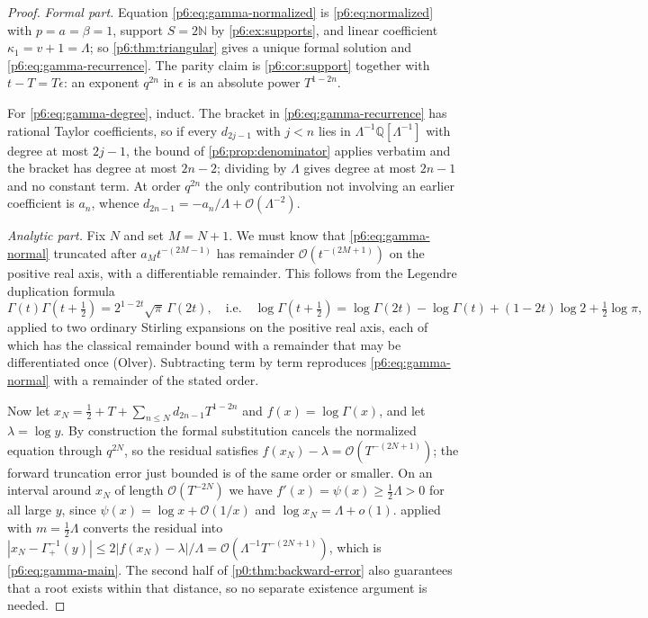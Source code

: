\documentclass[11pt,a4paper,oneside]{book}
\theoremstyle{plain}
\theoremstyle{definition}
\theoremstyle{remark}
\newcommand{\Nat}{\mathbb{N}}
\newcommand{\Rat}{\mathbb{Q}}
\newcommand{\bigO}{\mathcal{O}}
\newcommand{\littleo}{o}
\begin{document}
\begin{proof}
\emph{Formal part.}  Equation \eqref{p6:eq:gamma-normalized} is
\eqref{p6:eq:normalized} with $p=a=\beta=1$, support $S=2\Nat$ by
\cref{p6:ex:supports}, and linear coefficient $\kappa_1=v+1=\Lambda$; so
\cref{p6:thm:triangular} gives a unique formal solution and
\eqref{p6:eq:gamma-recurrence}.  The parity claim is
\cref{p6:cor:support} together with $t-T=T\epsilon$: an exponent $q^{2n}$ in
$\epsilon$ is an absolute power $T^{1-2n}$.

For \eqref{p6:eq:gamma-degree}, induct.  The bracket in
\eqref{p6:eq:gamma-recurrence} has rational Taylor coefficients, so if every
$d_{2j-1}$ with $j<n$ lies in $\Lambda^{-1}\Rat[\Lambda^{-1}]$ with degree at
most $2j-1$, the bound of \cref{p6:prop:denominator} applies verbatim and the
bracket has degree at most $2n-2$; dividing by $\Lambda$ gives degree at most
$2n-1$ and no constant term.  At order $q^{2n}$ the only contribution not
involving an earlier coefficient is $a_n$, whence
$d_{2n-1}=-a_n/\Lambda+\bigO(\Lambda^{-2})$.

\emph{Analytic part.}  Fix $N$ and set $M=N+1$.  We must know that
\eqref{p6:eq:gamma-normal} truncated after $a_Mt^{-(2M-1)}$ has remainder
$\bigO(t^{-(2M+1)})$ on the positive real axis, with a differentiable
remainder.  This follows from the Legendre duplication formula
\[
 \Gamma(t)\Gamma\!\left(t+\tfrac12\right)=2^{1-2t}\sqrt\pi\,\Gamma(2t),
 \quad\text{i.e.}\quad
 \log\Gamma\!\left(t+\tfrac12\right)
 =\log\Gamma(2t)-\log\Gamma(t)+(1-2t)\log2+\tfrac12\log\pi,
\]
applied to two ordinary Stirling expansions on the positive real axis, each of
which has the classical remainder bound with a remainder that may be
differentiated once (Olver).  Subtracting term by term reproduces
\eqref{p6:eq:gamma-normal} with a remainder of the stated order.

Now let $x_N=\tfrac12+T+\sum_{n\le N}d_{2n-1}T^{1-2n}$ and
$f(x)=\log\Gamma(x)$, and let $\lambda=\log y$.  By construction the formal
substitution cancels the normalized equation through $q^{2N}$, so the residual
satisfies $f(x_N)-\lambda=\bigO(T^{-(2N+1)})$; the forward truncation error
just bounded is of the same order or smaller.  On an interval around $x_N$ of
length $\bigO(T^{-2N})$ we have $f'(x)=\psi(x)\ge\tfrac12\Lambda>0$ for all
large $y$, since $\psi(x)=\log x+\bigO(1/x)$ and $\log x_N=\Lambda+\littleo(1)$.
 applied with $m=\tfrac12\Lambda$ converts the
residual into
$|x_N-\Gamma_+^{-1}(y)|\le2|f(x_N)-\lambda|/\Lambda
=\bigO(\Lambda^{-1}T^{-(2N+1)})$, which is \eqref{p6:eq:gamma-main}.  The
second half of \cref{p0:thm:backward-error} also guarantees that a root
exists within that distance, so no separate existence argument is needed.
\end{proof}
\end{document}
